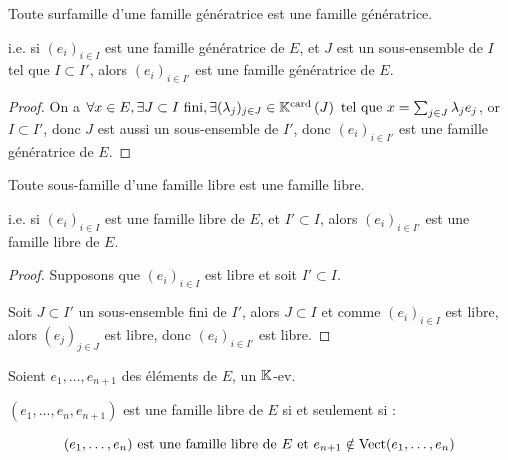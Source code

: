 \documentclass[12pt,a4paper]{report}
\begin{document}
\begin{property}
    Toute surfamille d'une famille génératrice est une famille génératrice.
    
    i.e. si $(e_i)_{i \in I}$ est une famille génératrice de $E$, et $J$ est un sous-ensemble de $I$ tel que $I \subset I'$, alors $(e_i)_{i \in I'}$ est une famille génératrice de $E$.
\end{property}

\begin{proof}
    On a $\forall x \in E, \exists J \subset I \text{ fini}, \exists (\lambda_j)_{j \in J} \in \mathbb{K}^\mathrm{card}\left(J\right) \text{ tel que } x = \sum_{j \in J} \lambda_j e_j$, or $I \subset I'$, donc $J$ est aussi un sous-ensemble de $I'$, donc $(e_i)_{i \in I'}$ est une famille génératrice de $E$.
\end{proof}

\begin{property}
    Toute sous-famille d'une famille libre est une famille libre.

    i.e. si $(e_i)_{i \in I}$ est une famille libre de $E$, et $I' \subset I$, alors $(e_i)_{i \in I'}$ est une famille libre de $E$.
\end{property}

\begin{proof}
    Supposons que $(e_i)_{i \in I}$ est libre et soit $I' \subset I$.
    
    Soit $J \subset I'$ un sous-ensemble fini de $I'$, alors $J \subset I$ et comme $(e_i)_{i \in I}$ est libre, alors $(e_j)_{j \in J}$ est libre, donc $(e_i)_{i \in I'}$ est libre.
\end{proof}

\begin{theorem}
    Soient $e_1,\dots,e_{n+1}$ des éléments de $E$, un $\mathbb{K}$-ev.

    $(e_1,\dots,e_n,e_{n+1})$ est une famille libre de $E$ si et seulement si :
    
    $$(e_1,\dots,e_n) \text{ est une famille libre de } E \text{ et } e_{n+1} \notin \mathrm{Vect}(e_1,\dots,e_n)$$
    \label{thm:famille_libre_ajout_element}
\end{theorem}
\end{document}
